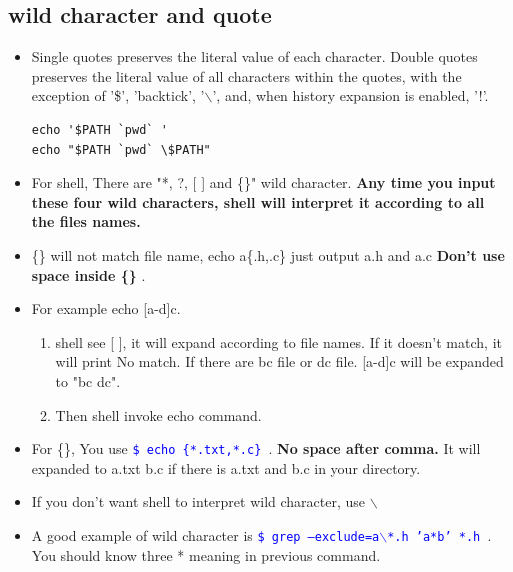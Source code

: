 \documentclass[a4paper,12pt,twoside]{book}
\newcommand{\linuxcommand}[1]{\texttt{\textcolor{blue}{\$ #1 \Pisymbol{psy}{191}}}}
\begin{document}
\subsection{wild character and quote}
\begin{itemize}
		\item Single quotes preserves the literal value of each character.  Double quotes preserves the literal value of all characters within the quotes, with the exception of '\$', 'backtick', '$\backslash$', and, when history expansion is enabled, '!'. 
\begin{verbatim}
echo '$PATH `pwd` '
echo "$PATH `pwd` \$PATH"
\end{verbatim}
		\item For shell, There are "*, ?, [ ] and \{\}" wild character. \textbf{Any time you input these four wild characters, shell will interpret it according to all the files names.}

		\item \{\} will not match file name, echo a\{.h,.c\} just output a.h and a.c \textbf{Don't use space inside \{\} }.

		\item For example echo [a-d]c.  
				\begin{enumerate}
						\item shell see [ ], it will expand according to file names. If it doesn't match, it will print No match. If there are bc file or dc file. [a-d]c will be expanded to "bc dc".
						\item Then shell invoke echo command.
				\end{enumerate}

		\item For \{\}, You use \linuxcommand{echo \{*.txt,*.c\}}. \textbf{No space after comma.} It will expanded to a.txt b.c if there is a.txt and b.c in your directory.

		\item If you don't want shell to interpret wild character, use $\backslash$

		\item A good example of wild character is \linuxcommand{grep --exclude=a$\backslash$*.h 'a*b' *.h}. You should know three * meaning in previous command.
\end{itemize}
\end{document}
